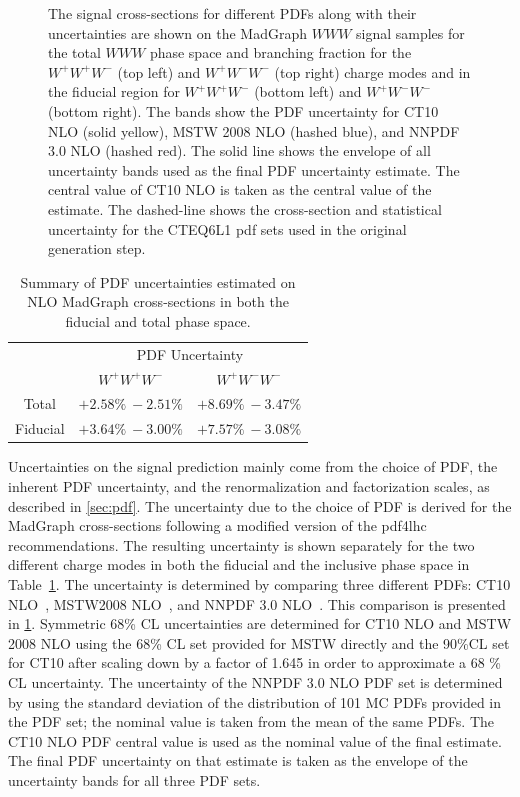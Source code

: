 \begin{figure}[ht!]
\caption{The signal cross-sections for different PDFs along with their
uncertainties are shown on the {\sc MadGraph} $WWW$ signal samples
for the total $WWW$ phase space and branching fraction for
the $W^{+}W^{+}W^{-}$ (top left) and $W^{+}W^{-}W^{-}$ (top right)
charge modes
and in the fiducial region for $W^{+}W^{+}W^{-}$ (bottom left) 
and $W^{+}W^{-}W^{-}$ (bottom right).
The bands show the PDF uncertainty for CT10 NLO (solid yellow),
MSTW 2008 NLO (hashed blue), and NNPDF 3.0 NLO (hashed red). The
solid line shows the envelope of all uncertainty bands used as the final
PDF uncertainty estimate. The central value of CT10 NLO is taken as the
central value of the estimate.
The dashed-line shows the cross-section and 
statistical uncertainty for the CTEQ6L1
pdf sets used in the original generation step.}
\label{fig:signal_pdf_unc}
\end{figure}

\begin{table}[ht!]
\centering
\begin{tabular}{c|c|c}
\hline
 & \multicolumn{2}{c}{PDF Uncertainty}\\
 & $W^{+}W^{+}W^{-}$ & $W^{+}W^{-}W^{-}$ \\
\hline
\hline
Total & $+2.58\%~-2.51\%$ &  $+8.69\%~-3.47\%$ \\
Fiducial & $+3.64\%~-3.00\%$ & $+7.57\%~-3.08\%$ \\
\hline
\end{tabular}
\caption{Summary of PDF uncertainties estimated on NLO {\sc MadGraph} cross-sections
in both the fiducial and total phase space.}
\label{tab:pdfunc}
\end{table}

Uncertainties on the signal prediction mainly come from the choice of PDF, 
the inherent PDF uncertainty, and the renormalization and factorization
scales, as described in \sec\ref{sec:pdf}.
The uncertainty due to the choice of PDF is derived for the {\sc MadGraph} 
cross-sections following a modified version of the pdf4lhc
\cite{Botje:2011sn} recommendations.  The resulting 
uncertainty is shown separately for the two different charge modes
in both the fiducial and the inclusive phase
space in Table~\ref{tab:pdfunc}.
The uncertainty is determined by comparing three different PDFs:
CT10 NLO~\cite{Lai:2010vv}, MSTW2008 NLO~\cite{Martin:2009iq}, 
and NNPDF 3.0 NLO~\cite{Ball:2014uwa}. 
This comparison is presented in \fig\ref{fig:signal_pdf_unc}.  
Symmetric 68\% CL uncertainties 
are determined for CT10 NLO and MSTW 2008 NLO using the 68\% CL 
set provided for MSTW directly and the 90\%CL set for CT10 after
scaling down by 
a factor of 1.645 in order to approximate a 68 \% CL uncertainty. 
The uncertainty of the NNPDF 3.0 NLO PDF set is 
determined by using the standard deviation of the distribution 
of 101 MC PDFs provided in the PDF set; the nominal value is taken
from the mean of the same PDFs.  
The CT10 NLO PDF central value is used as the nominal 
value of the final estimate.
The final PDF uncertainty on that estimate is
taken as the envelope of the uncertainty bands for all three PDF sets.  




